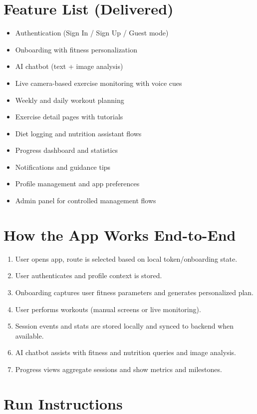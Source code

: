 \documentclass[12pt,a4paper]{article}
\begin{document}
\section{Feature List (Delivered)}
\begin{itemize}[leftmargin=1.2cm]
  \item Authentication (Sign In / Sign Up / Guest mode)
  \item Onboarding with fitness personalization
  \item AI chatbot (text + image analysis)
  \item Live camera-based exercise monitoring with voice cues
  \item Weekly and daily workout planning
  \item Exercise detail pages with tutorials
  \item Diet logging and nutrition assistant flows
  \item Progress dashboard and statistics
  \item Notifications and guidance tips
  \item Profile management and app preferences
  \item Admin panel for controlled management flows
\end{itemize}

\section{How the App Works End-to-End}
\begin{enumerate}[leftmargin=1.2cm]
  \item User opens app, route is selected based on local token/onboarding state.
  \item User authenticates and profile context is stored.
  \item Onboarding captures user fitness parameters and generates personalized plan.
  \item User performs workouts (manual screens or live monitoring).
  \item Session events and stats are stored locally and synced to backend when available.
  \item AI chatbot assists with fitness and nutrition queries and image analysis.
  \item Progress views aggregate sessions and show metrics and milestones.
\end{enumerate}

\section{Run Instructions}
\end{document}
